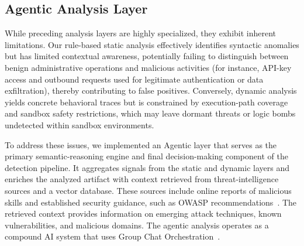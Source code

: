 



\subsection{Agentic Analysis Layer}
\label{sec:jiffylabs-llm}

While preceding analysis layers are highly specialized,
they exhibit inherent limitations. Our rule-based static
analysis effectively identifies syntactic anomalies but
has limited contextual awareness, potentially failing
to distinguish between benign administrative operations
and malicious activities (for instance, API-key access
and outbound requests used for legitimate authentication
or data exfiltration), thereby contributing to false
positives. Conversely, dynamic analysis yields concrete
behavioral traces but is constrained by execution-path
coverage and sandbox safety restrictions, which may
leave dormant threats or logic bombs undetected
within sandbox environments.

To address these issues, we implemented an Agentic layer that serves as the primary semantic-reasoning engine and
final decision-making component of the detection pipeline. It aggregates signals from
the static and dynamic layers and enriches the analyzed artifact with context retrieved
from threat-intelligence sources and a vector database. These sources include online
reports of malicious skills and established security guidance, such as OWASP
recommendations~\cite{owaspagentskills}. The retrieved context provides information on
emerging attack techniques, known vulnerabilities, and malicious domains. The agentic analysis operates as a compound AI system that uses Group Chat Orchestration~\cite{orchestration_design_pattern}.


